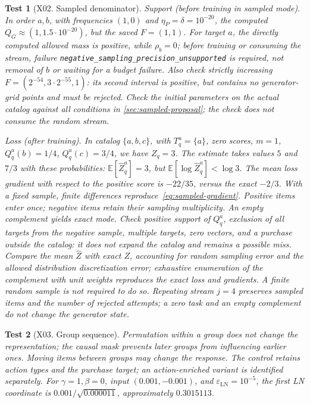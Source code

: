 \documentclass[12pt,a4paper]{article}
\newcommand{\code}[1]{{\ttfamily\small\nolinkurl{#1}}}
\newcommand{\E}{\mathbb E}
\newcommand{\eps}{\varepsilon}
\theoremstyle{plainru}
\newtheorem{testcase}{Test}[section]
\begin{document}
\begin{testcase}[X02. Sampled denominator]
\emph{Support (before training in sampled mode).}
In order $a,b$, with frequencies $(1,0)$ and $\eta_P=\delta=10^{-20}$,
the computed $Q_G\approx(1,1.5\cdot10^{-20})$, but the saved $F=(1,1)$.
For target $a$, the directly computed allowed mass is positive, while $\rho_b=0$;
before training or consuming the stream, failure
\code{negative_sampling_precision_unsupported} is required, not removal of $b$
or waiting for a budget failure. Also check strictly increasing
$F=(2^{-54},3\cdot2^{-55},1)$: its second interval is positive,
but contains no generator-grid points and must be rejected.
Check the initial parameters on the actual catalog against all conditions in
\ref{sec:sampled-proposal}; the check does not consume the random stream.

\emph{Loss (after training).}
In catalog $\{a,b,c\}$, with $T_q^a=\{a\}$, zero scores,
$m=1$, $Q_q^a(b)=1/4$, $Q_q^a(c)=3/4$, we have $Z_q=3$.
The estimate takes values $5$ and $7/3$ with these probabilities:
$\E[\widehat Z_q^a]=3$, but $\E[\log\widehat Z_q^a]<\log3$.
The mean loss gradient with respect to the positive score is $-22/35$,
versus the exact $-2/3$. With a fixed sample, finite differences
reproduce~\eqref{eq:sampled-gradient}.
Positive items enter once; negative items retain
their sampling multiplicity. An empty complement yields exact mode.
Check positive support of $Q_q^a$, exclusion of all targets from
the negative sample, multiple targets, zero vectors,
and a purchase outside the catalog: it does not expand the catalog and remains a possible miss.
Compare the mean $\widehat Z$ with exact $Z$, accounting for random
sampling error and the allowed distribution discretization error;
exhaustive enumeration of the complement with unit weights reproduces the exact
loss and gradients. A finite random sample is not required to do so.
Repeating stream $j=4$ preserves sampled items and the number of rejected attempts;
a zero task and an empty complement do not change the generator state.
\end{testcase}

\begin{testcase}[X03. Group sequence]
Permutation within a group does not change the representation; the causal mask
prevents later groups from influencing earlier ones. Moving items between groups
may change the response. The control retains action types and the purchase target;
an action-enriched variant is identified separately.
For $\gamma=1,\beta=0$, input $(0.001,-0.001)$, and $\eps_{\mathrm{LN}}=10^{-5}$,
the first LN coordinate is $0.001/\sqrt{0.000011}$, approximately $0.3015113$.
\end{testcase}
\end{document}
